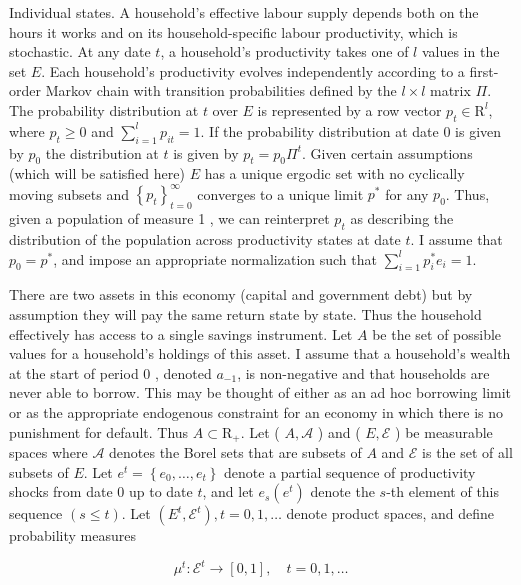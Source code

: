 \documentclass[11pt]{article}
\begin{document}
Individual states. A household's effective labour supply depends both on the hours it works and on its household-specific labour productivity, which is stochastic. At any date $t$, a household's productivity takes one of $l$ values in the set $E$. Each household's productivity evolves independently according to a first-order Markov chain with transition probabilities defined by the $l \times l$ matrix $\Pi$. The probability distribution at $t$ over $E$ is represented by a row vector $p_{t} \in \mathrm{R}^{l}$, where $p_{t} \geq 0$ and $\sum_{i=1}^{l} p_{i t}=1$. If the probability distribution at date 0 is given by $p_{0}$ the distribution at $t$ is given by $p_{t}=p_{0} \Pi^{t}$. Given certain assumptions (which will be satisfied here) $E$ has a unique ergodic set with no cyclically moving subsets and $\left\{p_{t}\right\}_{t=0}^{\infty}$ converges to a unique limit $p^{*}$ for any $p_{0}$. Thus, given a population of measure 1 , we can reinterpret $p_{t}$ as describing the distribution of the population across productivity states at date $t$. I assume that $p_{0}=p^{*}$, and impose an appropriate normalization such that $\sum_{i=1}^{l} p_{i}^{*} e_{i}=1$.

There are two assets in this economy (capital and government debt) but by assumption they will pay the same return state by state. Thus the household effectively has access to a single savings instrument. Let $A$ be the set of possible values for a household's holdings of this asset. I assume that a household's wealth at the start of period 0 , denoted $a_{-1}$, is non-negative and that households are never able to borrow. This may be thought of either as an ad hoc borrowing limit or as the appropriate endogenous constraint for an economy in which there is no punishment for default. Thus $A \subset \mathrm{R}_{+}$. Let ( $A, \mathcal{A}$ ) and ( $E, \mathcal{E}$ ) be measurable spaces where $\mathcal{A}$ denotes the Borel sets that are subsets of $A$ and $\mathcal{E}$ is the set of all subsets of $E$. Let $e^{t}=\left\{e_{0}, \ldots, e_{t}\right\}$ denote a partial sequence of productivity shocks from date 0 up to date $t$, and let $e_{s}\left(e^{t}\right)$ denote the $s$-th element of this sequence $(s \leq t)$. Let $\left(E^{t}, \mathcal{E}^{t}\right), t=0,1, \ldots$ denote product spaces, and define probability measures


\begin{equation*}
\mu^{t}: \mathcal{E}^{t} \rightarrow[0,1], \quad t=0,1, \ldots \tag{3.1}
\end{equation*}
\end{document}
